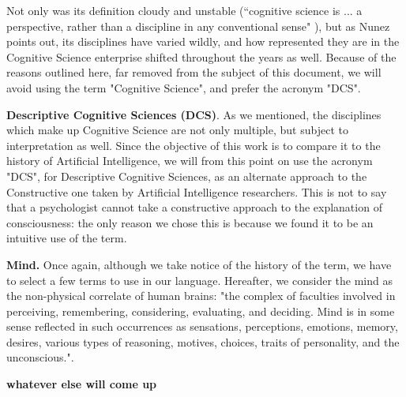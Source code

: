 \documentclass[../main.tex]{subfiles}
\begin{document}
Not only was its definition cloudy and unstable (“cognitive science is ... a perspective, rather than a discipline in any conventional sense" \cite{sheehyCognitiveScience1995}), but as Nunez points out, its disciplines have varied wildly, and how represented they are in the Cognitive Science enterprise shifted throughout the years as well. Because of the reasons outlined here, far removed from the subject of this document, we will avoid using the term "Cognitive Science", and prefer the acronym "DCS".

\vspace{5pt}
\textbf{Descriptive Cognitive Sciences (DCS)}. As we mentioned, the disciplines which make up Cognitive Science are not only multiple, but subject to interpretation as well. Since the objective of this work is to compare it to the history of Artificial Intelligence, we will from this point on use the acronym "DCS", for Descriptive Cognitive Sciences, as an alternate approach to the Constructive one taken by Artificial Intelligence researchers. This is not to say that a psychologist cannot take a constructive approach to the explanation of consciousness: the only reason we chose this is because we found it to be an intuitive use of the term.

\vspace{5pt}
\textbf{Mind.} Once again, although we take notice of the history of the term, we have to select a few terms to use in our language. Hereafter, we consider the mind as the non-physical correlate of human brains: "the complex of faculties involved in perceiving, remembering, considering, evaluating, and deciding. Mind is in some sense reflected in such occurrences as sensations, perceptions, emotions, memory, desires, various types of reasoning, motives, choices, traits of personality, and the unconscious."\cite{Mind}.

\vspace{5pt}
\textbf{whatever else will come up}
\end{document}
